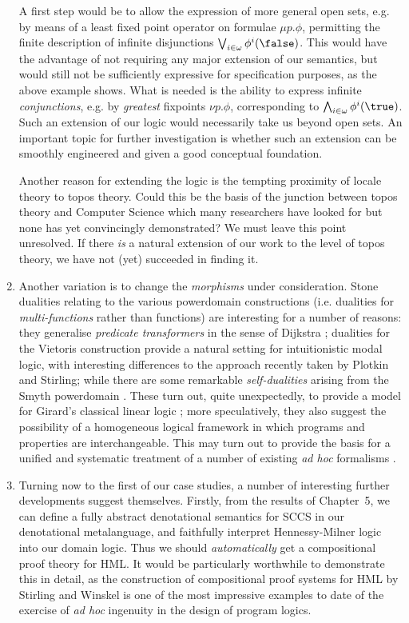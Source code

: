 \begin{enumerate}
A first step would be to allow the expression of more general open sets, e.g. by means of  a least fixed point operator on formulae $\mu p . \phi$, permitting the finite description of infinite disjunctions $\bigvee_{i \in \omega} \phi^{i}(\false )$.
This would have the advantage of not requiring any major extension of our semantics, but would still not be sufficiently expressive for specification purposes, as the above example shows.
What is needed is the ability to express infinite {\em conjunctions}, e.g. by {\em greatest} fixpoints $\nu p . \phi$, corresponding to $\bigwedge_{i \in \omega} \phi^{i}(\true )$.
Such an extension of our logic would necessarily take us beyond open sets.
An important topic for further investigation is whether such an extension can be smoothly engineered and given a good conceptual foundation.

Another reason for extending the logic is the tempting proximity of locale theory to topos theory.
Could this be the basis of the junction between topos theory and Computer Science which many researchers have looked for but none has yet convincingly demonstrated?
We must leave this point unresolved.
If there {\it is} a natural extension of our work to the level of topos theory, we have not (yet) succeeded in finding it.
\item Another variation is to change the {\em morphisms} under consideration.
Stone dualities relating to the various powerdomain constructions
(i.e. dualities for {\em multi-functions} rather than functions) are
interesting for a number of reasons: they generalise
{\em predicate transformers} in the sense of Dijkstra \cite{Dij76,Smy83};
dualities for the Vietoris construction provide a natural setting
for intuitionistic modal logic, with interesting differences to
the approach recently taken by Plotkin and Stirling;
while there are some remarkable {\em self-dualities} arising from the
Smyth powerdomain \cite{Vic87c}.
These turn out, quite unexpectedly, to provide a model for
Girard's classical linear logic \cite{Gir87}; more speculatively,
they also suggest the
possibility of a homogeneous logical framework in which programs and
properties are interchangeable.
This may turn out to provide the basis for a unified and systematic
treatment of a number of existing  {\it ad hoc} formalisms \cite{GS86,Win85}.
\item Turning now to the first of our case studies, a number of interesting further developments suggest themselves.
Firstly, from the results of Chapter~5, we can define a fully abstract denotational semantics for SCCS in our denotational metalanguage, and faithfully interpret Hennessy-Milner logic into our domain logic.
Thus we should {\em automatically} get a compositional proof theory for HML.
It would be particularly worthwhile to demonstrate this in detail, as the construction of compositional proof systems for HML by Stirling \cite{Sti87} and Winskel \cite{Win85} is one of the most impressive examples to date of the exercise of {\it ad hoc} ingenuity in the design of program logics.


\end{enumerate}
